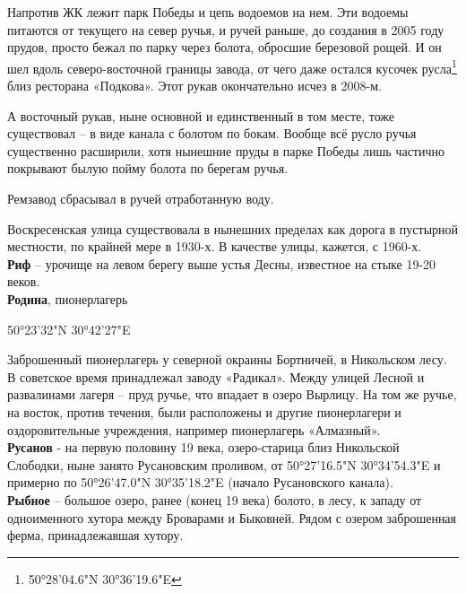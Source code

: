 Напротив ЖК лежит парк Победы и цепь водоемов на нем. Эти водоемы питаются от текущего на север ручья, и ручей раньше, до создания в 2005 году прудов, просто бежал по парку через болота, обросшие березовой рощей. И он шел вдоль северо-восточной границы завода, от чего даже остался кусочек русла\footnote{50°28'04.6"N 30°36'19.6"E} близ ресторана «Подкова». Этот рукав окончательно исчез в 2008-м. 

А восточный рукав, ныне основной и единственный в том месте, тоже существовал – в виде канала с болотом по бокам. Вообще всё русло ручья существенно расширили, хотя нынешние пруды в парке Победы лишь частично покрывают былую пойму болота по берегам ручья.

Ремзавод сбрасывал в ручей отработанную воду.

Воскресенская улица существовала в нынешних пределах как дорога в пустырной местности, по крайней мере в 1930-х. В качестве улицы, кажется,  с 1960-х.\\

\textbf{Риф} – урочище на левом берегу выше устья Десны, известное на стыке 19-20 веков.\\

\textbf{Родина}, пионерлагерь

50°23'32"N 30°42'27"E

Заброшенный пионерлагерь у северной окраины Бортничей, в Никольском лесу. В советское время принадлежал заводу «Радикал». Между улицей Лесной и развалинами лагеря – пруд ручье, что впадает в озеро Вырлицу. На том же ручье, на восток, против течения, были расположены и другие пионерлагери и оздоровительные учреждения, например пионерлагерь «Алмазный».\\


\textbf{Русанов} - на первую половину 19 века, озеро-старица близ Никольской Слободки, ныне занято Русановским проливом, от 50°27'16.5"N 30°34'54.3"E и примерно по 50°26'47.0"N 30°35'18.2"E (начало Русановского канала).\\



\textbf{Рыбное} – большое озеро, ранее (конец 19 века) болото, в лесу, к западу от одноименного хутора между Броварами и Быковней. Рядом с озером заброшенная ферма, принадлежавшая хутору.
